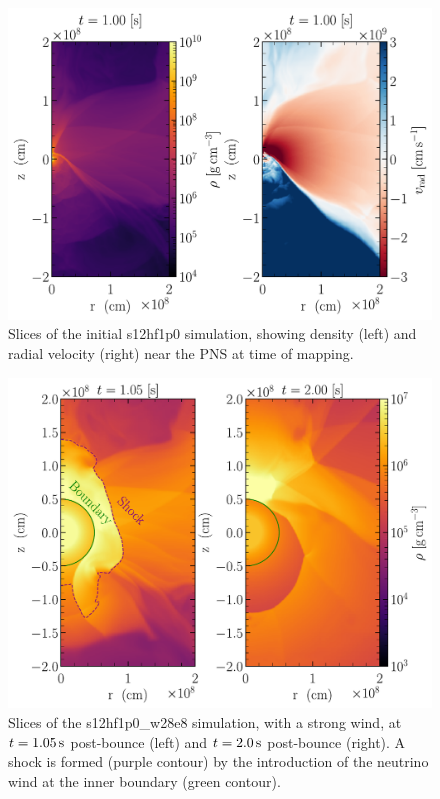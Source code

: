 \begin{figure}
    \centering
    \includegraphics[width=1.0\linewidth]{figures/s12hf1p0_og.pdf}
    \caption{Slices of the initial s12hf1p0 simulation, showing density (left) and radial velocity (right) near the PNS at time of mapping.}
    \label{fig:s12hf1p0_og}
\end{figure}

\begin{figure}[ht!]
    \centering
    \includegraphics[width=1.0\linewidth]{figures/s12hf1p0_strong_slice_annot.pdf}
    \caption{Slices of the s12hf1p0\_w28e8 simulation, with a strong wind, at \(t=1.05\,\mathrm{s}\) post-bounce (left) and \(t=2.0\,\mathrm{s}\) post-bounce (right). A shock is formed (purple contour) by the introduction of the neutrino wind at the inner boundary (green contour).}
    \label{fig:s12hf1p0_strong_slice}
\end{figure}


